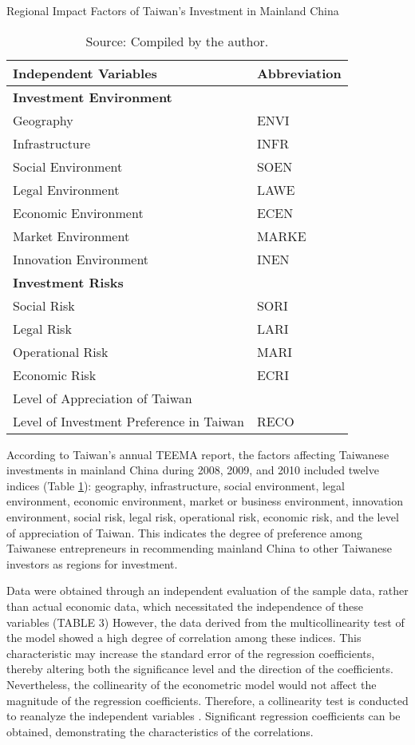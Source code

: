 \documentclass{article}
\begin{document}
\begin{table}[H]
\centering
\caption{Regional Impact Factors of Taiwan's Investment in Mainland China}
\begin{tabular}{ll}
\toprule
\textbf{Independent Variables} & \textbf{Abbreviation} \\
\midrule
\textbf{Investment Environment} & \\
Geography & ENVI \\
Infrastructure & INFR \\
Social Environment & SOEN \\
Legal Environment & LAWE \\
Economic Environment & ECEN \\
Market Environment & MARKE \\
Innovation Environment & INEN \\
\midrule
\textbf{Investment Risks} & \\
Social Risk & SORI \\
Legal Risk & LARI \\
Operational Risk & MARI \\
Economic Risk & ECRI \\
\midrule
Level of Appreciation of Taiwan & \\
Level of Investment Preference in Taiwan & RECO \\
\bottomrule
\end{tabular}
\caption*{Source: Compiled by the author.}
\label{tab:factors}
\end{table}

According to Taiwan's annual TEEMA report, the factors affecting Taiwanese
investments in mainland China during 2008, 2009, and 2010 included twelve indices
(Table \ref{tab:factors}): geography, infrastructure, social environment, legal environment, economic
environment, market or business environment, innovation environment, social risk, legal
risk, operational risk, economic risk, and the level of appreciation of Taiwan. This
indicates the degree of preference among Taiwanese entrepreneurs in recommending
mainland China to other Taiwanese investors as regions for investment.

Data were obtained through an independent evaluation of the sample data, rather
than actual economic data, which necessitated the independence of these variables
(TABLE 3) However, the data derived from the multicollinearity test of the model showed
a high degree of correlation among these indices. This characteristic may increase the
standard error of the regression coefficients, thereby altering both the significance level
and the direction of the coefficients. Nevertheless, the collinearity of the econometric model would not affect the magnitude of the regression coefficients.
Therefore, a collinearity test is conducted to reanalyze the independent variables \citep{baltagi_wald_lr_lm_inequality, gomes_international_trade_per_capita_gdp}. Significant regression coefficients can be obtained, demonstrating the characteristics of the correlations.
\end{document}
